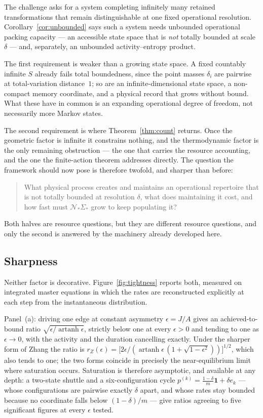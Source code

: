 The challenge asks for a system completing infinitely many retained transformations
that remain distinguishable at one fixed operational resolution.
Corollary~\ref{cor:unbounded} says such a system needs unbounded operational packing
capacity --- an accessible state space that is \emph{not} totally bounded at scale
$\delta$ --- and, separately, an unbounded activity--entropy product.

The first requirement is weaker than a growing state space. A fixed countably
infinite $S$ already fails total boundedness, since the point masses $\delta_i$ are
pairwise at total-variation distance~$1$; so are an infinite-dimensional state space,
a non-compact memory coordinate, and a physical record that grows without bound. What
these have in common is an expanding operational degree of freedom, not necessarily
more Markov states.

The second requirement is where Theorem~\ref{thm:count} returns. Once the geometric
factor is infinite it constrains nothing, and the thermodynamic factor is the only
remaining obstruction --- the one that carries the resource accounting, and the one
the finite-action theorem addresses directly. The question the framework should now
pose is therefore twofold, and sharper than before:
\begin{quote}
What physical process creates and maintains an operational repertoire that is not
totally bounded at resolution $\delta$, what does maintaining it cost, and how fast
must $\mathcal{N}_*\Sigma_*$ grow to keep populating it?
\end{quote}
Both halves are resource questions, but they are different resource questions, and
only the second is answered by the machinery already developed here.

\subsection{Sharpness}

Neither factor is decorative. Figure~\ref{fig:tightness} reports both, measured on
integrated master equations in which the rates are reconstructed explicitly at each
step from the instantaneous distribution.

Panel~(a): driving one edge at constant asymmetry $\epsilon=J/A$ gives an
achieved-to-bound ratio $\sqrt{\epsilon/\operatorname{artanh}\epsilon}$, strictly
below one at every $\epsilon>0$ and tending to one as $\epsilon\to0$, with the
activity and the duration cancelling exactly. Under the sharper form of Zhang the
ratio is
$r_Z(\epsilon)=\bigl[2\epsilon/(\operatorname{artanh}\epsilon\,(1+\sqrt{1-\epsilon^2}))\bigr]^{1/2}$,
which also tends to one; the two forms coincide in precisely the near-equilibrium
limit where saturation occurs. Saturation is therefore asymptotic, and available at
any depth: a two-state shuttle and a six-configuration cycle
$p^{(k)}=\frac{1-\delta}{m}\mathbf{1}+\delta e_k$ --- whose configurations are
pairwise exactly $\delta$ apart, and whose rates stay bounded because no coordinate
falls below $(1-\delta)/m$ --- give ratios agreeing to five significant figures at
every $\epsilon$ tested.

